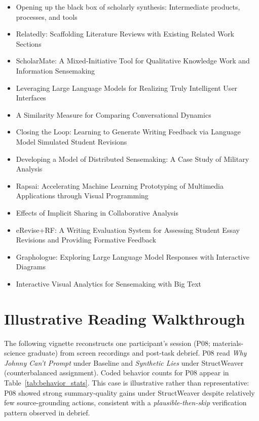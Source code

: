 \documentclass[manuscript,review,anonymous]{acmart}
\begin{document}
\begin{itemize}[leftmargin=*, noitemsep]
  \item Opening up the black box of scholarly synthesis: Intermediate products, processes, and tools~\cite{qian_scholarly_synthesis}
  \item Relatedly: Scaffolding Literature Reviews with Existing Related Work Sections~\cite{relatedly}
  \item ScholarMate: A Mixed-Initiative Tool for Qualitative Knowledge Work and Information Sensemaking~\cite{scholarmate}
  \item Leveraging Large Language Models for Realizing Truly Intelligent User Interfaces~\cite{oelen_llm_iui}
  \item A Similarity Measure for Comparing Conversational Dynamics~\cite{condyns}
  \item Closing the Loop: Learning to Generate Writing Feedback via Language Model Simulated Student Revisions~\cite{nair_closing_loop}
  \item Developing a Model of Distributed Sensemaking: A Case Study of Military Analysis~\cite{wheat_distributed_sensemaking}
  \item Rapsai: Accelerating Machine Learning Prototyping of Multimedia Applications through Visual Programming~\cite{rapsai}
  \item Effects of Implicit Sharing in Collaborative Analysis~\cite{goyal_implicit_sharing}
  \item eRevise+RF: A Writing Evaluation System for Assessing Student Essay Revisions and Providing Formative Feedback~\cite{erevise_rf}
  \item Graphologue: Exploring Large Language Model Responses with Interactive Diagrams~\cite{graphologue}
  \item Interactive Visual Analytics for Sensemaking with Big Text~\cite{big_text_sensemaking}
\end{itemize}

\section{Illustrative Reading Walkthrough}
\label{appendix:walkthrough}

The following vignette reconstructs one participant's session (P08; materials-science graduate) from screen recordings and post-task debrief. P08 read \textit{Why Johnny Can't Prompt} under Baseline and \textit{Synthetic Lies} under StructWeaver (counterbalanced assignment). Coded behavior counts for P08 appear in Table~\ref{tab:behavior_stats}. This case is illustrative rather than representative: P08 showed strong summary-quality gains under StructWeaver despite relatively few source-grounding actions, consistent with a \textit{plausible-then-skip} verification pattern observed in debrief.
\end{document}
